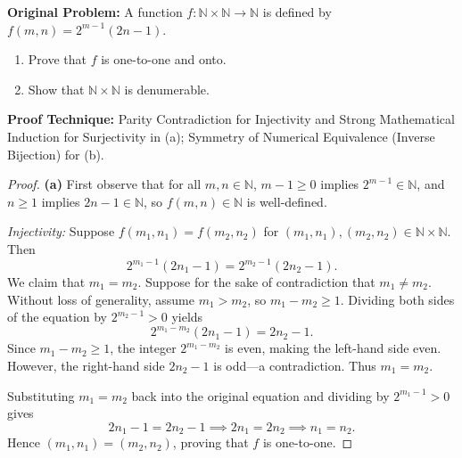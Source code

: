 \documentclass[11pt, letterpaper]{article}
\theoremstyle{definition}
\theoremstyle{remark}
\begin{document}
\textbf{Original Problem:} A function $f : \mathbb{N} \times \mathbb{N} \to \mathbb{N}$ is defined by $f(m, n) = 2^{m-1}(2n - 1)$.
\begin{enumerate}[label=(\alph*)]
    \item Prove that $f$ is one-to-one and onto.
    \item Show that $\mathbb{N} \times \mathbb{N}$ is denumerable.
\end{enumerate}

\textbf{Proof Technique:} Parity Contradiction for Injectivity and Strong Mathematical Induction for Surjectivity in (a); Symmetry of Numerical Equivalence (Inverse Bijection) for (b).

\begin{proof}
\textbf{(a)} First observe that for all $m, n \in \mathbb{N}$, $m - 1 \ge 0$ implies $2^{m-1} \in \mathbb{N}$, and $n \ge 1$ implies $2n - 1 \in \mathbb{N}$, so $f(m, n) \in \mathbb{N}$ is well-defined.

\emph{Injectivity:} Suppose $f(m_1, n_1) = f(m_2, n_2)$ for $(m_1, n_1), (m_2, n_2) \in \mathbb{N} \times \mathbb{N}$. Then
\[
2^{m_1 - 1}(2n_1 - 1) = 2^{m_2 - 1}(2n_2 - 1).
\]
We claim that $m_1 = m_2$. Suppose for the sake of contradiction that $m_1 \neq m_2$. Without loss of generality, assume $m_1 > m_2$, so $m_1 - m_2 \ge 1$. Dividing both sides of the equation by $2^{m_2 - 1} > 0$ yields
\[
2^{m_1 - m_2}(2n_1 - 1) = 2n_2 - 1.
\]
Since $m_1 - m_2 \ge 1$, the integer $2^{m_1 - m_2}$ is even, making the left-hand side even. However, the right-hand side $2n_2 - 1$ is odd---a contradiction. Thus $m_1 = m_2$.

Substituting $m_1 = m_2$ back into the original equation and dividing by $2^{m_1 - 1} > 0$ gives
\[
2n_1 - 1 = 2n_2 - 1 \implies 2n_1 = 2n_2 \implies n_1 = n_2.
\]
Hence $(m_1, n_1) = (m_2, n_2)$, proving that $f$ is one-to-one.


\end{proof}
\end{document}
